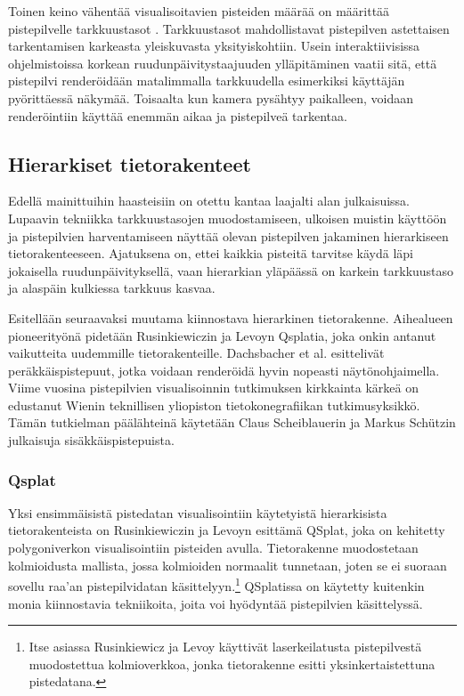 Toinen keino vähentää visualisoitavien pisteiden määrää on määrittää pistepilvelle tarkkuustasot . Tarkkuustasot mahdollistavat pistepilven astettaisen tarkentamisen karkeasta yleiskuvasta yksityiskohtiin. Usein interaktiivisissa ohjelmistoissa korkean ruudunpäivitystaajuuden ylläpitäminen vaatii sitä, että pistepilvi renderöidään matalimmalla tarkkuudella esimerkiksi käyttäjän pyörittäessä näkymää. Toisaalta kun kamera pysähtyy paikalleen, voidaan renderöintiin käyttää enemmän aikaa ja pistepilveä tarkentaa.

\subsection{Hierarkiset tietorakenteet}\label{tietorakenteet}

Edellä mainittuihin haasteisiin on otettu kantaa laajalti alan julkaisuissa. Lupaavin tekniikka tarkkuustasojen muodostamiseen, ulkoisen muistin käyttöön ja pistepilvien harventamiseen näyttää olevan pistepilven jakaminen hierarkiseen tietorakenteeseen. Ajatuksena on, ettei kaikkia pisteitä tarvitse käydä läpi jokaisella ruudunpäivityksellä, vaan hierarkian yläpäässä on karkein tarkkuustaso ja alaspäin kulkiessa tarkkuus kasvaa.  

Esitellään seuraavaksi muutama kiinnostava hierarkinen tietorakenne. Aihealueen pioneerityönä pidetään Rusinkiewiczin ja Levoyn Qsplatia, joka onkin antanut vaikutteita uudemmille tietorakenteille. Dachsbacher et al. esittelivät peräkkäispistepuut, jotka voidaan renderöidä hyvin nopeasti näytönohjaimella. Viime vuosina pistepilvien visualisoinnin tutkimuksen kirkkainta kärkeä on edustanut Wienin teknillisen yliopiston tietokonegrafiikan tutkimusyksikkö. Tämän tutkielman päälähteinä käytetään Claus Scheiblauerin ja Markus Schützin julkaisuja sisäkkäispistepuista.

\subsubsection{Qsplat}
Yksi ensimmäisistä pistedatan visualisointiin käytetyistä hierarkisista tietorakenteista on Rusinkiewiczin ja Levoyn esittämä QSplat, joka on kehitetty polygoniverkon visualisointiin pisteiden avulla. Tietorakenne muodostetaan kolmioidusta mallista, jossa kolmioiden normaalit tunnetaan, joten se ei suoraan sovellu raa'an pistepilvidatan käsittelyyn.\footnote{Itse asiassa Rusinkiewicz ja Levoy käyttivät laserkeilatusta pistepilvestä muodostettua kolmioverkkoa, jonka tietorakenne esitti yksinkertaistettuna pistedatana.} QSplatissa on käytetty kuitenkin monia kiinnostavia tekniikoita, joita voi hyödyntää pistepilvien käsittelyssä. \cite{qsplat}

